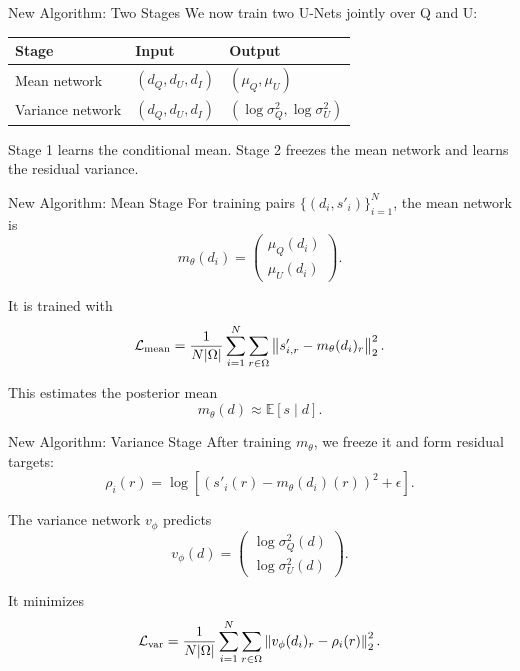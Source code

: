 \documentclass[10pt,aspectratio=169]{beamer}
\newcommand{\signal}{s}
\newcommand{\data}{d}
\newcommand{\synth}{s'}
\begin{document}
\begin{frame}{New Algorithm: Two Stages}
  We now train two U-Nets jointly over Q and U:

  \begin{center}
  \begin{tabular}{lll}
    \toprule
    Stage & Input & Output \\
    \midrule
    Mean network & \((d_Q,d_U,d_I)\) & \((\mu_Q,\mu_U)\) \\
    Variance network & \((d_Q,d_U,d_I)\) & \((\log\sigma_Q^2,\log\sigma_U^2)\) \\
    \bottomrule
  \end{tabular}
  \end{center}

  \vspace{0.7em}
  Stage 1 learns the conditional mean. Stage 2 freezes the mean network and learns the residual variance.
\end{frame}

\begin{frame}{New Algorithm: Mean Stage}
  For training pairs \(\{(\data_i,\synth_i)\}_{i=1}^N\), the mean network is
  \[
    m_\theta(\data_i)
    =
    \begin{pmatrix}
      \mu_Q(\data_i) \\
      \mu_U(\data_i)
    \end{pmatrix}.
  \]

  \vspace{0.5em}
  It is trained with
  \[
    \mathcal{L}_{\rm mean}
    =
    \frac{1}{N|\Omega|}
    \sum_{i=1}^{N}
    \sum_{r\in\Omega}
    \left\|
      \synth_{i,r} - m_\theta(\data_i)_r
    \right\|_2^2 .
  \]

  \vspace{0.5em}
  This estimates the posterior mean
  \[
    m_\theta(\data)
    \approx
    \mathbb{E}[\signal\mid\data].
  \]
\end{frame}

\begin{frame}{New Algorithm: Variance Stage}
  After training \(m_\theta\), we freeze it and form residual targets:
  \[
    \rho_i(r)
    =
    \log
    \left[
      \left(
        \synth_i(r) - m_\theta(\data_i)(r)
      \right)^2
      + \epsilon
    \right].
  \]

  \vspace{0.5em}
  The variance network \(v_\phi\) predicts
  \[
    v_\phi(\data)
    =
    \begin{pmatrix}
      \log\sigma_Q^2(\data) \\
      \log\sigma_U^2(\data)
    \end{pmatrix}.
  \]

  \vspace{0.5em}
  It minimizes
  \[
    \mathcal{L}_{\rm var}
    =
    \frac{1}{N|\Omega|}
    \sum_{i=1}^{N}
    \sum_{r\in\Omega}
    \left\|
      v_\phi(\data_i)_r - \rho_i(r)
    \right\|_2^2 .
  \]
\end{frame}
\end{document}
